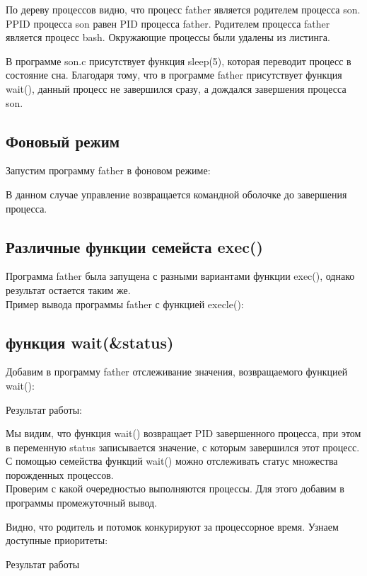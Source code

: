 \documentclass[a4paper]{article}
\begin{document}
	По дереву процессов  видно, что процесс father является родителем процесса son. PPID процесса son равен PID процесса father. Родителем процесса father является процесс bash. Окружающие процессы были удалены из листинга.
	
	В программе son.c присутствует функция sleep(5), которая переводит процесс в состояние сна. Благодаря тому, что в программе father присутствует функция wait(), данный процесс не завершился сразу, а дождался завершения процесса son.
	
\subsection{Фоновый режим}
	Запустим программу father в фоновом режиме:
	
	В данном случае управление возвращается командной оболочке до завершения процесса.
	
\subsection{Различные функции семейста exec()}
	Программа father была запущена с разными вариантами функции exec(), однако результат остается таким же.\\
Пример вывода программы father с функцией execle():
	

\subsection{функция wait(\&status)}		
	Добавим в программу father отслеживание значения, возвращаемого функцией wait():
	
	
	Результат работы:
	
	
	Мы видим, что функция wait() возвращает PID завершенного процесса, при этом в переменную status записывается значение, с которым завершился этот процесс. С помощью семейства функций wait() можно отслеживать статус множества порожденных процессов.\\
	
	Проверим с какой очередностью выполняются процессы. Для этого добавим в программы промежуточный вывод.
	
	
	
	Видно, что родитель и потомок конкурируют за процессорное время. Узнаем доступные приоритеты:
	
	Результат работы
	
	
\end{document}

